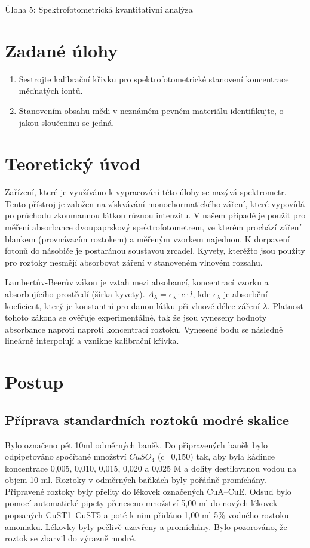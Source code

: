 \documentclass[13pt, a4paper, twoside]{article}
\begin{document}
    \begin{center}
        \Huge
        Úloha 5: Spektrofotometrická kvantitativní analýza
    \end{center}
    \onehalfspacing \large
    \section*{Zadané úlohy}
    \begin{enumerate}
        \item Sestrojte kalibrační křivku pro spektrofotometrické stanovení koncentrace měďnatých
        iontů.
        \item Stanovením obsahu mědi v neznámém pevném materiálu identifikujte, o jakou sloučeninu
        se jedná.
    \end{enumerate}
    \section*{Teoretický úvod}
    Zařízení, které je využíváno k vypracování této úlohy se nazývá spektrometr.
    Tento přístroj je založen na získvávání monochormatického záření, které vypovídá
    po průchodu zkoumannou látkou různou intenzitu. V našem případě je použit pro
    měření absorbance dvoupaprskový spektrofotometrem, ve kterém prochází záření blankem
    (provnávacím roztokem) a měřeným vzorkem najednou. K dorpavení fotonů do násobiče
    je postaránou soustavou zrcadel. Kyvety, kteréžto jsou použity pro roztoky nesmějí
    absorbovat záření v stanoveném vlnovém rozsahu.


    Lambertův-Beerův zákon je vztah mezi absobancí, koncentrací vzorku a absorbujícího prostředí
    (šírka kyvety). $A_{\lambda}=\epsilon_{\lambda} \cdot c \cdot l$, kde $\epsilon_{\lambda}$
    je absorbční koeficient, který je konstantní pro danou látku při vlnové délce záření $\lambda$.
    Platnost tohoto zákona se ověřuje experimentálně, tak že jsou vyneseny hodnoty absorbance naproti
    naproti koncentrací roztoků. Vynesené bodu se následně lineárně interpolují a vznikne kalibrační křivka.

    \section*{Postup}
    \subsection*{Příprava standardních roztoků modré skalice}
    Bylo označeno pět 10ml odměrných baněk. Do připravených baněk bylo odpipetováno 
    spočítané množství $CuSO_4$ (c=0,150) tak, aby byla kádince koncentrace 0,005, 0,010,
    0,015, 0,020 a 0,025 M a dolity destilovanou vodou na objem 10 ml. Roztoky v odměrných 
    baňkách byly pořádně promíchány. Připravené roztoky byly přelity do lékovek označených 
    CuA–CuE. Odsud bylo pomocí automatické pipety přeneseno množství 5,00 ml do nových
    lékovek popsaných CuST1–CuST5 a poté k nim přidáno 1,00 ml 5\% vodného roztoku
    amoniaku. Lékovky byly pečlivě uzavřeny a promíchány. Bylo pozorováno, že roztok se zbarvil do výrazně modré. 
\end{document}
